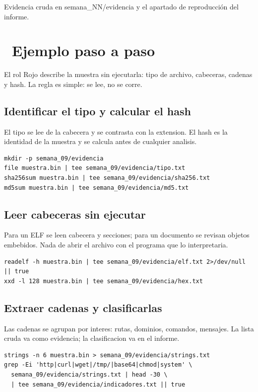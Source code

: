 \documentclass[11pt,a4paper]{article}
\newcommand{\iconotexto}[2]{\textcolor{cyanNeon}{\faIcon{#1}}~#2}
\begin{document}
Evidencia cruda en semana\_NN/evidencia y el apartado de reproducción del informe.

\section{\iconotexto{list-ol}{Ejemplo paso a paso}}

El rol Rojo describe la muestra sin ejecutarla: tipo de archivo, cabeceras, cadenas y hash. La regla es simple: se lee, no se corre.

\subsection{Identificar el tipo y calcular el hash}

El tipo se lee de la cabecera y se contrasta con la extension. El hash es la identidad de la muestra y se calcula antes de cualquier analisis.

\begin{lstlisting}[style=estiloCodigo]
mkdir -p semana_09/evidencia
file muestra.bin | tee semana_09/evidencia/tipo.txt
sha256sum muestra.bin | tee semana_09/evidencia/sha256.txt
md5sum muestra.bin | tee semana_09/evidencia/md5.txt
\end{lstlisting}

\subsection{Leer cabeceras sin ejecutar}

Para un ELF se leen cabecera y secciones; para un documento se revisan objetos embebidos. Nada de abrir el archivo con el programa que lo interpretaria.

\begin{lstlisting}[style=estiloCodigo]
readelf -h muestra.bin | tee semana_09/evidencia/elf.txt 2>/dev/null || true
xxd -l 128 muestra.bin | tee semana_09/evidencia/hex.txt
\end{lstlisting}

\subsection{Extraer cadenas y clasificarlas}

Las cadenas se agrupan por interes: rutas, dominios, comandos, mensajes. La lista cruda va como evidencia; la clasificacion va en el informe.

\begin{lstlisting}[style=estiloCodigo]
strings -n 6 muestra.bin > semana_09/evidencia/strings.txt
grep -Ei 'http|curl|wget|/tmp/|base64|chmod|system' \
  semana_09/evidencia/strings.txt | head -30 \
  | tee semana_09/evidencia/indicadores.txt || true
\end{lstlisting}
\end{document}
